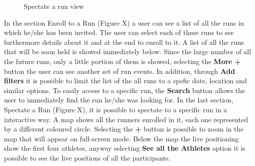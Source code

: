 \begin{enumerate}
\begin{figure}[H]
\begin{center}
\begin{minipage}[c]{.40\textwidth}
	\caption{Spectate a run view}
        \end{minipage}
      \end{center}
\end{figure}
In the section Enroll to a Run (Figure X) a user can see a list of all the runs in which he/she has been invited. The user can select each of these runs to see furthermore details about it and at the end to enroll to it. A list of all the runs that will be soon held is showed immediately below. Since the large number of all the future runs, only a little portion of them is showed, selecting the \textbf{More +} button the user can see another set of run events. In addition, through \textbf{Add filters} it is possible to limit the list of the all runs to a spefic date, location and similar options. To easily access to a specific run, the \textbf{Search} button allows the user to immediately find the run he/she was looking for. In the last section, Spectate a Run (Figure X), it is possible to spectate to a specific run in a interactive way. A map shows all the runners enrolled in it, each one represented by a different coloured circle. Selecting the \textbf{+} button is possible to zoom in the map that will appear on full-screen mode. Below the map the live positioning show the first four athletes, anyway selecting \textbf{See all the Athletes} option it is possible to see the live positions of all the participants.
\clearpage
\end{enumerate}
